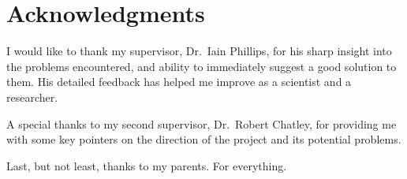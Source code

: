 
\chapter{Acknowledgments} %

\label{Acknowledgments} %


I would like to thank my supervisor, Dr.\ Iain Phillips, for his sharp insight into the problems encountered, and ability to immediately suggest a good solution to them. His detailed feedback has helped me improve as a scientist and a researcher.

A special thanks to my second supervisor, Dr.\ Robert Chatley, for providing me with some key pointers on the direction of the project and its potential problems.

Last, but not least, thanks to my parents. For everything.

